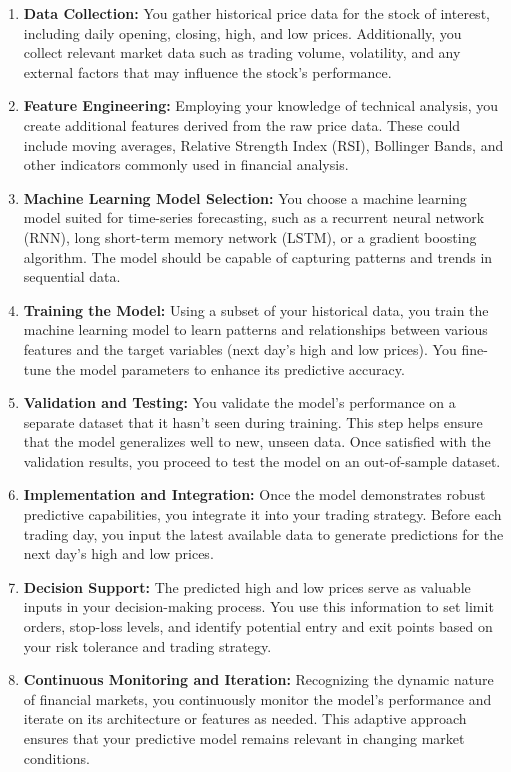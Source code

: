 \documentclass[
  letterpaper,
  DIV=11,
  numbers=noendperiod]{scrreprt}
\begin{document}
\begin{enumerate}
\def\labelenumi{\arabic{enumi}.}
\item
  \textbf{Data Collection:} You gather historical price data for the
  stock of interest, including daily opening, closing, high, and low
  prices. Additionally, you collect relevant market data such as trading
  volume, volatility, and any external factors that may influence the
  stock's performance.
\item
  \textbf{Feature Engineering:} Employing your knowledge of technical
  analysis, you create additional features derived from the raw price
  data. These could include moving averages, Relative Strength Index
  (RSI), Bollinger Bands, and other indicators commonly used in
  financial analysis.
\item
  \textbf{Machine Learning Model Selection:} You choose a machine
  learning model suited for time-series forecasting, such as a recurrent
  neural network (RNN), long short-term memory network (LSTM), or a
  gradient boosting algorithm. The model should be capable of capturing
  patterns and trends in sequential data.
\item
  \textbf{Training the Model:} Using a subset of your historical data,
  you train the machine learning model to learn patterns and
  relationships between various features and the target variables (next
  day's high and low prices). You fine-tune the model parameters to
  enhance its predictive accuracy.
\item
  \textbf{Validation and Testing:} You validate the model's performance
  on a separate dataset that it hasn't seen during training. This step
  helps ensure that the model generalizes well to new, unseen data. Once
  satisfied with the validation results, you proceed to test the model
  on an out-of-sample dataset.
\item
  \textbf{Implementation and Integration:} Once the model demonstrates
  robust predictive capabilities, you integrate it into your trading
  strategy. Before each trading day, you input the latest available data
  to generate predictions for the next day's high and low prices.
\item
  \textbf{Decision Support:} The predicted high and low prices serve as
  valuable inputs in your decision-making process. You use this
  information to set limit orders, stop-loss levels, and identify
  potential entry and exit points based on your risk tolerance and
  trading strategy.
\item
  \textbf{Continuous Monitoring and Iteration:} Recognizing the dynamic
  nature of financial markets, you continuously monitor the model's
  performance and iterate on its architecture or features as needed.
  This adaptive approach ensures that your predictive model remains
  relevant in changing market conditions.
\end{enumerate}
\end{document}
